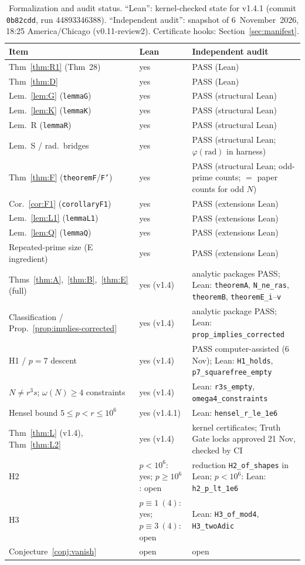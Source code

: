 \documentclass[11pt,reqno]{amsart}
\newcommand{\ph}{\varphi}
\theoremstyle{definition}
\begin{document}
\begin{table}[ht]
\centering
\caption{Formalization and audit status. ``Lean'': kernel-checked state for v1.4.1 (commit \texttt{0b82cdd}, run 44893346388). ``Independent audit'': snapshot of 6~November~2026, 18:25 America/Chicago (v0.11-review2). Certificate hooks: Section~\ref{sec:manifest}.}
\label{tab:formalization}
{\footnotesize
\begin{tabular}{@{}p{4.1cm}p{1.6cm}p{5.6cm}@{}}
\toprule
Item & Lean & Independent audit \\
\midrule
Thm~\ref{thm:R1} (Thm~28) & yes & PASS (Lean) \\
Thm~\ref{thm:D} & yes & PASS (Lean) \\
Lem.~\ref{lem:G} (\texttt{lemmaG}) & yes & PASS (structural Lean) \\
Lem.~\ref{lem:K} (\texttt{lemmaK}) & yes & PASS (structural Lean) \\
Lem.~R (\texttt{lemmaR}) & yes & PASS (structural Lean) \\
Lem.~S / rad.\ bridges & yes & PASS (structural Lean; \(\ph(\mathrm{rad})\) in harness) \\
Thm~\ref{thm:F} (\texttt{theoremF}/\texttt{F'}) & yes & PASS (structural Lean; odd-prime counts; \(=\) paper counts for odd \(N\)) \\
Cor.~\ref{cor:F1} (\texttt{corollaryF1}) & yes & PASS (extensions Lean) \\
Lem.~\ref{lem:L1} (\texttt{lemmaL1}) & yes & PASS (extensions Lean) \\
Lem.~\ref{lem:Q} (\texttt{lemmaQ}) & yes & PASS (extensions Lean) \\
Repeated-prime size (E ingredient) & yes & PASS (extensions Lean) \\
Thms~\ref{thm:A},~\ref{thm:B},~\ref{thm:E} (full) & yes (v1.4) & analytic packages PASS; Lean: \texttt{theoremA}, \texttt{N\_ne\_ras}, \texttt{theoremB}, \texttt{theoremE\_i}--\texttt{v} \\
Classification / Prop.~\ref{prop:implies-corrected} & yes (v1.4) & analytic package PASS; Lean: \texttt{prop\_implies\_corrected} \\
H1 / \(p=7\) descent & yes (v1.4) & PASS computer-assisted (6 Nov); Lean: \texttt{H1\_holds}, \texttt{p7\_squarefree\_empty} \\
\(N\ne r^3s\); \(\omega(N)\ge 4\) constraints & yes (v1.4) & Lean: \texttt{r3s\_empty}, \texttt{omega4\_constraints} \\
Hensel bound \(5\le p<r\le 10^6\) & yes (v1.4.1) & Lean: \texttt{hensel\_r\_le\_1e6} \\
Thm~\ref{thm:L} (v1.4), Thm~\ref{thm:L2} & yes (v1.4) & kernel certificates; Truth Gate locks approved 21 Nov, checked by CI \\
H2 & \(p<10^6\): yes; \(p\ge 10^6\): open & reduction \texttt{H2\_of\_shapes} in Lean; \(p<10^6\): Lean: \texttt{h2\_p\_lt\_1e6} \\
H3 & \(p\equiv 1\ (4)\): yes; \(p\equiv 3\ (4)\): open & Lean: \texttt{H3\_of\_mod4}, \texttt{H3\_twoAdic} \\
Conjecture~\ref{conj:vanish} & open & open \\
\bottomrule
\end{tabular}
}
\end{table}
\end{document}
